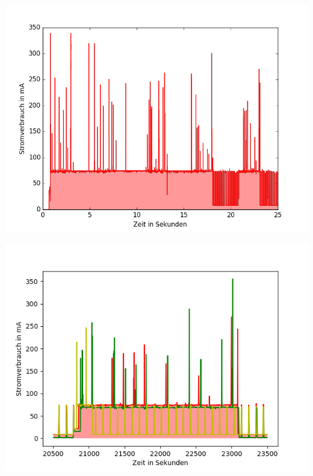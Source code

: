 \documentclass[18pt]{beamer}
\begin{document}
\begin{frame}
	\begin{minipage}[c][\textheight][c]{\textwidth}
		\centering
		\includegraphics[height=0.95\textheight]{plots/wifills.png}
	\end{minipage}
\end{frame}

\begin{frame}
	\begin{minipage}[c][\textheight][c]{\textwidth}
		\centering
		\includegraphics[height=0.95\textheight]{plots/llsalle.png}
	\end{minipage}
\end{frame}
\end{document}
